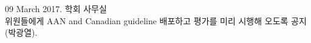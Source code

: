 \documentclass[idxtotoc,hyperref,openany, oneside]{labbook} %
\newcommand{\HRule}{\rule{\linewidth}{0.5mm}} %
\begin{document}
09 March  2017. 학회 사무실\\
위원들에게 AAN and Canadian guideline 배포하고 평가를 미리 시행해 오도록 공지(박광열).

%
%
%
%
%
%
%
%
%
%
%
%
%
%
%
%
%
%
%
\end{document}
